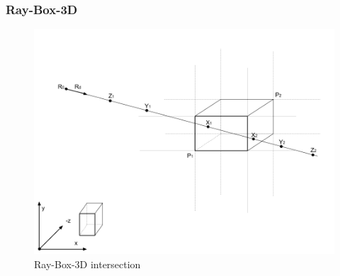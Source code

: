\subsubsection{Ray-Box-3D}

\begin{figure}[H]
\caption[ray-box-3d-intersection]{Ray-Box-3D intersection}
\label{fig:ray-box-3d}
\centering
\includegraphics[width=\linewidth]{Figures/ray-box-3d-intersection.png}
\decoRule
\end{figure}

